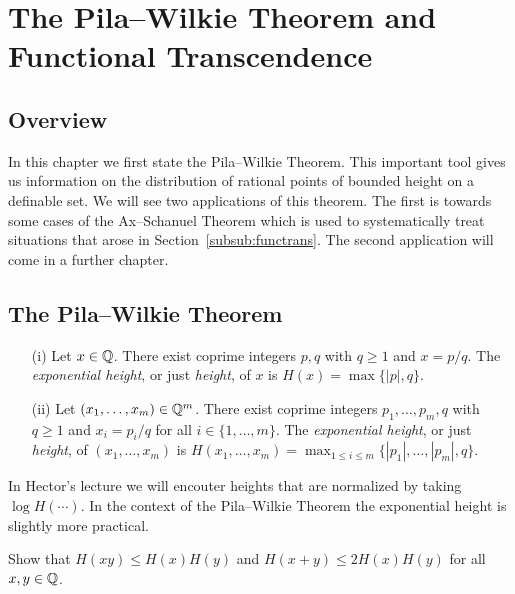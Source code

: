\chapter{The Pila--Wilkie Theorem and Functional Transcendence}

\section{Overview}

In this chapter we first state the Pila--Wilkie Theorem. This
important tool gives us information on the distribution of rational
points of bounded height on a definable set. We will see two
applications of this theorem. The first is towards some cases of the
Ax--Schanuel Theorem which is used to systematically treat situations
that arose in Section~\ref{subsub:functrans}. The second application
will come in a further chapter. 

\section{The Pila--Wilkie Theorem}

\begin{definition}
  \label{def:height1}
  \begin{enumerate}
  \item [(i)]
  Let $x\in {\mathbb{Q}}$. There exist coprime integers $p,q$ with
  $q\ge 1$ and $x=p/q$. The \emph{exponential height}, or just
  \emph{height},  of $x$ is $H(x)=\max\{|p|,q\}$.
  \item[(ii)] Let $(x_1,\ldots,x_m)\in{\mathbb{Q}}^m$. There exist coprime integers
  $p_1,\ldots,p_m,q$ with $q\ge 1$ and $x_i = p_i/q$ for all $i\in
  \{1,\ldots,m\}$.
  The \emph{exponential height}, or just \emph{height},
  of $(x_1,\ldots,x_m)$ is $H(x_1,\ldots,x_m)
  = \max_{1\le i\le m} \{|p_1|,\ldots,|p_m|,q\}$.
  \end{enumerate}
\end{definition}

In Hector's lecture we will encouter heights that are normalized by
taking $\log H(\cdots)$. In the context of the
Pila--Wilkie Theorem the exponential height is slightly more
practical.

\begin{exercise}
  Show that $H(xy)\le H(x)H(y)$ and $H(x+y)\le 2H(x)H(y)$ for all
  $x,y\in{\mathbb{Q}}$. 
\end{exercise}

